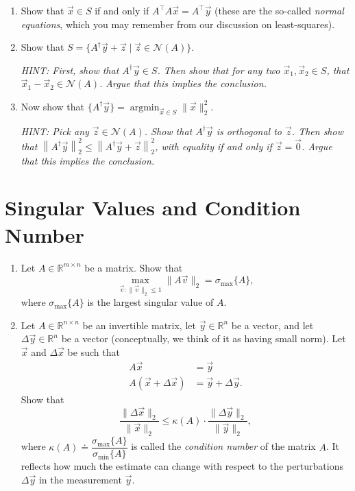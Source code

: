 \documentclass[10pt]{article}
\theoremstyle{definition}
\theoremstyle{plain}
\newcommand{\RR}{\mathbb{R}}
\newcommand{\NN}{\mathcal{N}}
\DeclareMathOperator{\argmin}{argmin}
\begin{document}
\begin{enumerate}[label=(\alph*), resume]
\item Show that $\vec{x} \in S$ if and only if $A^\top A \vec{x} = A^\top \vec{y}$ (these are the so-called \textit{normal equations}, which you may remember from our discussion on least-squares).

\item Show that $S = \{A^\dagger \vec{y} + \vec{z} \mid \vec{z} \in \NN(A)\}$.

\textit{HINT: First, show that $A^\dagger \vec{y} \in S$. Then show that for any two $\vec{x}_1, \vec{x}_2 \in S$, that $\vec{x}_1 - \vec{x}_2 \in \NN(A)$. Argue that this implies the conclusion.}

\item Now show that $\{A^\dagger \vec{y}\} = \argmin_{\vec{x} \in S} \|\vec{x}\|_2^2$.

\textit{HINT: Pick any $\vec{z} \in \NN(A)$. Show that $A^\dagger \vec{y}$ is orthogonal to $\vec{z}$. Then show that $\left\|A^\dagger \vec{y}\right\|_2^2 \le \left\|A^\dagger \vec{y} + \vec{z}\right\|_2^2$, with equality if and only if $\vec{z} = \vec{0}$. Argue that this implies the conclusion.}
\end{enumerate}

\newpage

\section{Singular Values and Condition Number}

\begin{enumerate}[label=(\alph*)]
\item Let $A \in \RR^{m \times n}$ be a matrix. Show that
\begin{equation}
\max_{\vec{v}:\|\vec{v}\|_2 \le 1} \|A\vec{v}\|_2 = \sigma_{\max}\{A\},
\end{equation}
where $\sigma_{\max}\{A\}$ is the largest singular value of $A$.

\item Let $A \in \RR^{n \times n}$ be an invertible matrix, let $\vec{y} \in \RR^n$ be a vector, and let $\Delta\vec{y} \in \RR^n$ be a vector (conceptually, we think of it as having small norm). Let $\vec{x}$ and $\Delta\vec{x}$ be such that
\begin{align}
A\vec{x} &= \vec{y} \\
A(\vec{x} + \Delta\vec{x}) &= \vec{y} + \Delta\vec{y}.
\end{align}
Show that
\begin{equation}
\frac{\|\Delta\vec{x}\|_2}{\|\vec{x}\|_2} \le \kappa(A) \cdot \frac{\|\Delta\vec{y}\|_2}{\|\vec{y}\|_2},
\end{equation}
where $\kappa(A) \doteq \dfrac{\sigma_{\max}\{A\}}{\sigma_{\min}\{A\}}$ is called the \textit{condition number} of the matrix $A$. It reflects how much the estimate can change with respect to the perturbations $\Delta\vec{y}$ in the measurement $\vec{y}$.
\end{enumerate}
\end{document}
